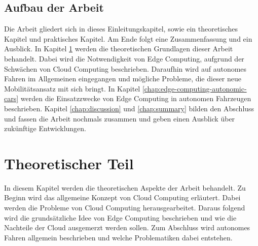 \documentclass{sigchi}
\begin{document}
\subsection{Aufbau der Arbeit}
Die Arbeit gliedert sich in dieses Einleitungskapitel, sowie ein theoretisches Kapitel und praktisches Kapitel. Am Ende folgt eine Zusammenfassung und ein Ausblick. In Kapitel \ref{chap:theoretic-part} werden die theoretischen Grundlagen dieser Arbeit behandelt. Dabei wird die Notwendigkeit von Edge Computing, aufgrund der Schwächen von Cloud Computing beschrieben. Daraufhin wird auf autonomes Fahren im Allgemeinen eingegangen und mögliche Probleme, die dieser neue Mobilitätsansatz mit sich bringt. In Kapitel \ref{chap:edge-computing-autonomic-cars} werden die Einsatzzwecke von Edge Computing in autonomen Fahrzeugen beschrieben. Kapitel \ref{chap:discussion} und \ref{chap:summary} bilden den Abschluss und fassen die Arbeit nochmals zusammen und geben einen Ausblick über zukünftige Entwicklungen.

\section{Theoretischer Teil} \label{chap:theoretic-part}
In diesem Kapitel werden die theoretischen Aspekte der Arbeit behandelt. Zu Beginn wird das allgemeine Konzept von Cloud Computing erläutert. Dabei werden die Probleme von Cloud Computing herausgearbeitet. Daraus folgend wird die grundsätzliche Idee von Edge Computing beschrieben und wie die Nachteile der Cloud ausgemerzt werden sollen. Zum Abschluss wird autonomes Fahren allgemein beschrieben und welche Problematiken dabei entstehen.
\end{document}
